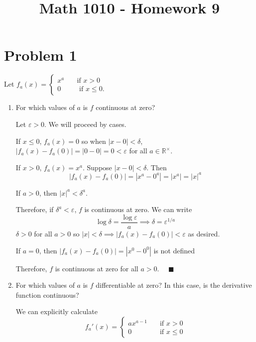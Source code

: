 \documentclass[12pt]{article}
\title{Math 1010 - Homework 9}
\author{}
\date{}
\newcommand{\R}{\mathbb{R}}
\newcommand{\qed}{\quad \blacksquare}
\newcommand{\abs}[1]{\left\vert #1 \right\vert}
\newcommand{\ep}{\varepsilon}
\begin{document}
\maketitle
\vspace*{-1in}


\section{Problem 1 }
Let $f_a(x)=\begin{cases}
    x^a \quad &\text{if } x > 0\\ 
    0 \quad &\text{ if } x \leq 0.
\end{cases}$
\begin{enumerate}
	\item For which values of $a$ is $f$ continuous at zero?
    
        \color{blue}
            Let $\ep > 0$. We will proceed by cases. 

            If $x \leq 0$, $f_a(x) = 0$ so when $\abs{x - 0} < \delta$, $\abs{f_a(x) - f_a(0)} = \abs{0 - 0} = 0 < \ep$ for all $a \in \R^{\times}$. 

            If $x > 0$, $f_a(x) = x^a$. Suppose $\abs{x - 0} < \delta$. Then 
            \[\abs{f_a(x) - f_a(0)} = \abs{x^a - 0^a} = \abs{x^a} = \abs{x}^a\]

            If $a > 0$, then $\abs{x}^a < \delta^a$. 

            Therefore, if $\delta^a < \ep$, $f$ is continuous at zero. We can write 
            \[\log \delta = \frac{\log \ep}{a} \implies \delta = \ep^{1/a}\]
            $\delta > 0$ for all $a > 0$ so $\abs{x} < \delta \implies \abs{f_a(x) - f_a(0)} < \ep$ as desired. 

            If $a = 0$, then $\abs{f_a(x) - f_a(0)} = \abs{x^0 - 0^0}$ is not defined

            Therefore, $f$ is continuous at zero for all $a > 0$. $\qed$

        \color{black}

	\item For which values of $a$ is $f$ differentiable at zero? In this case, is the derivative function continuous?
	
        \color{blue}
            We can explicitly calculate 
            \[f_a'(x) = \begin{cases}
                ax^{a-1} \quad &\text{if } x > 0\\
                0 \quad &\text{if } x \leq 0
            \end{cases}\]


\end{enumerate}
\end{document}
